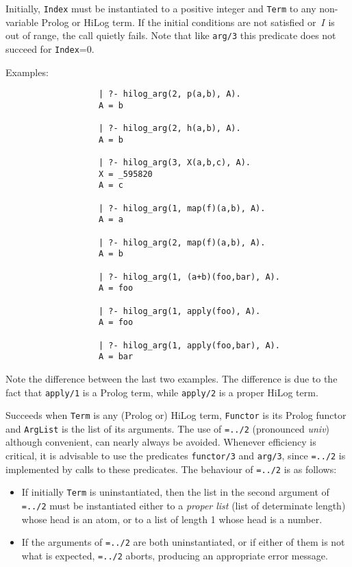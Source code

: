 \begin{description}
    Initially, {\tt Index} must be instantiated to a positive integer and 
    {\tt Term} to any non-variable Prolog or HiLog term.
    If the initial conditions are not satisfied or~$I$ is 
    out of range, the call quietly fails. Note that like {\tt arg/3}
    this predicate does not succeed for {\tt Index}=0.

    Examples:
    {\footnotesize
     \begin{verbatim}
                   | ?- hilog_arg(2, p(a,b), A).
                   A = b

                   | ?- hilog_arg(2, h(a,b), A).
                   A = b

                   | ?- hilog_arg(3, X(a,b,c), A).
                   X = _595820
                   A = c

                   | ?- hilog_arg(1, map(f)(a,b), A).
                   A = a

                   | ?- hilog_arg(2, map(f)(a,b), A).
                   A = b

                   | ?- hilog_arg(1, (a+b)(foo,bar), A).
                   A = foo

                   | ?- hilog_arg(1, apply(foo), A). 
                   A = foo

                   | ?- hilog_arg(1, apply(foo,bar), A).
                   A = bar
     \end{verbatim}}

    Note the difference between the last two examples. The difference is 
    due to the fact that {\tt apply/1} is a Prolog term, while 
    {\tt apply/2} is a proper HiLog term.

    Succeeds when {\tt Term} is any (Prolog or) HiLog term, {\tt Functor} is 
    its Prolog functor and {\tt ArgList} is the list of its arguments. 
    The use of {\tt =../2} (pronounced {\em univ}) although convenient, 
    can nearly always be avoided.
    Whenever efficiency is critical, it is advisable to use the
    predicates {\tt functor/3} and {\tt arg/3}, since {\tt =../2} is 
    implemented by calls to these predicates.  The behaviour of 
    {\tt =../2} is as follows:
    \begin{itemize}
    \item If initially {\tt Term} is uninstantiated, then the list in the 
          second argument of {\tt =../2} must be instantiated either to a
          {\em proper list} (list of determinate length) whose head is an 
          atom, or to a list of length 1 whose head is a number.
    \item If the arguments of {\tt =../2} are both uninstantiated, or if 
          either of them is not what is expected, {\tt =../2} aborts, 
          producing an appropriate error message.
    \end{itemize}


\end{description}
